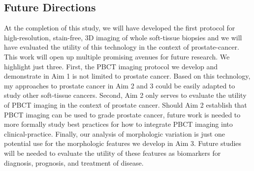 \documentclass{NIHGrant}
\theoremstyle{theorem}
\begin{document}
\subsection*{Future Directions}
At the completion of this study, we will have developed the first protocol for high-resolution, stain-free, 3D imaging of whole soft-tissue biopsies and we will have evaluated the utility of this technology in the context of prostate-cancer. This work will open up multiple promising avenues for future research. We highlight just three. First, the PBCT imaging protocol we develop and demonstrate in Aim 1 is not limited to prostate cancer. Based on this technology, my approaches to prostate cancer in Aim 2 and 3 could be easily adapted to study other soft-tissue cancers. Second, Aim 2 only serves to evaluate the utility of PBCT imaging in the context of prostate cancer. Should Aim 2 establish that PBCT imaging can be used to grade prostate cancer, future work is needed to more formally study best practices for how to integrate PBCT imaging into clinical-practice. Finally, our analysis of morphologic variation is just one potential use for the morphologic features we develop in Aim 3.  Future studies will be needed to evaluate the utility of these features as biomarkers for diagnosis, prognosis, and treatment of disease.

\newpage
%


\end{document}
